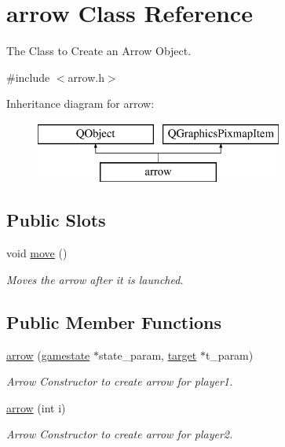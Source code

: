 \hypertarget{classarrow}{}\section{arrow Class Reference}
\label{classarrow}


The Class to Create an Arrow Object.  




{\ttfamily \#include $<$arrow.\+h$>$}

Inheritance diagram for arrow\+:\begin{figure}[H]
\begin{center}
\leavevmode
\includegraphics[height=2.000000cm]{classarrow}
\end{center}
\end{figure}
\subsection*{Public Slots}
\begin{DoxyCompactItemize}
\item 
\mbox{\label{classarrow_aeffacc576310b21b006ddf225159f576}} 
void \hyperlink{classarrow_aeffacc576310b21b006ddf225159f576}{move} ()
\begin{DoxyCompactList}\small\item\em Moves the arrow after it is launched. \end{DoxyCompactList}\end{DoxyCompactItemize}
\subsection*{Public Member Functions}
\begin{DoxyCompactItemize}
\item 
\hyperlink{classarrow_aad351384362146630ada6411bde30640}{arrow} (\hyperlink{classgamestate}{gamestate} $\ast$state\+\_\+param, \hyperlink{classtarget}{target} $\ast$t\+\_\+param)
\begin{DoxyCompactList}\small\item\em Arrow Constructor to create arrow for player1. \end{DoxyCompactList}\item 
\mbox{\label{classarrow_a1d7f5d14c75ee5dccfdf8aee90e873dc}} 
\hyperlink{classarrow_a1d7f5d14c75ee5dccfdf8aee90e873dc}{arrow} (int i)
\begin{DoxyCompactList}\small\item\em Arrow Constructor to create arrow for player2. \end{DoxyCompactList}\end{DoxyCompactItemize}
